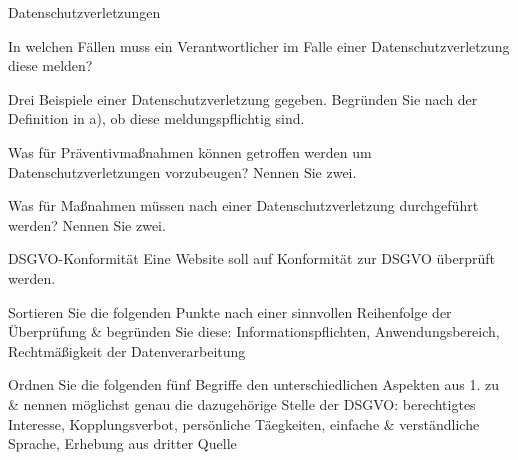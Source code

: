 \documentclass{exercisesheet}
\begin{document}
\begin{exercise**}{Datenschutzverletzungen}
  \item In welchen Fällen muss ein Verantwortlicher im Falle einer Datenschutzverletzung diese melden?
  \item Drei Beispiele einer Datenschutzverletzung gegeben. Begründen Sie nach der Definition in a), ob diese meldungspflichtig sind.
  \item Was für Präventivmaßnahmen können getroffen werden um Datenschutzverletzungen vorzubeugen? Nennen Sie zwei.
  \item Was für Maßnahmen müssen nach einer Datenschutzverletzung durchgeführt werden? Nennen Sie zwei.
\end{exercise**}

\begin{exercise*}{DSGVO-Konformität}{
    Eine Website soll auf Konformität zur DSGVO überprüft werden.
  }
  \item Sortieren Sie die folgenden Punkte nach einer sinnvollen Reihenfolge der Überprüfung \& begründen Sie diese: Informationspflichten, Anwendungsbereich, Rechtmäßigkeit der Datenverarbeitung
  \item Ordnen Sie die folgenden fünf Begriffe den unterschiedlichen Aspekten aus 1. zu \& nennen möglichst genau die dazugehörige Stelle der DSGVO: berechtigtes Interesse, Kopplungsverbot, persönliche Täegkeiten, einfache \& verständliche Sprache, Erhebung aus dritter Quelle
\end{exercise*}
\end{document}
